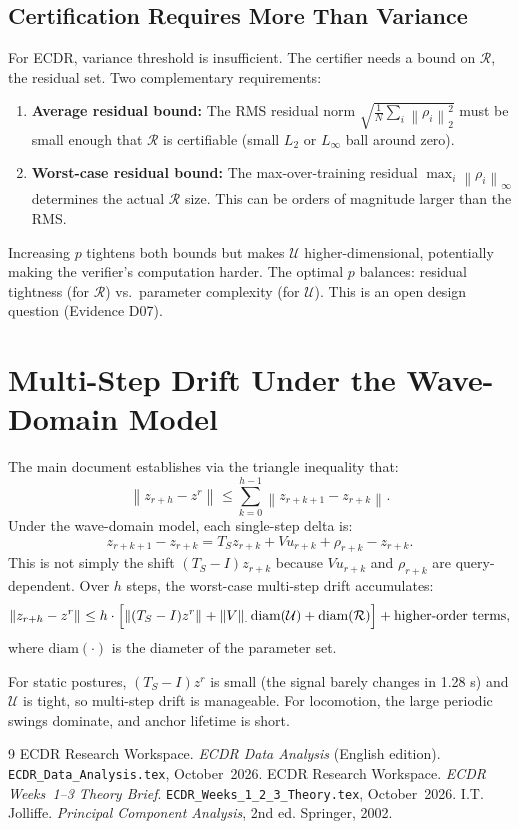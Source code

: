 \documentclass[11pt, a4paper]{article}
\theoremstyle{definition}
\theoremstyle{plain}
\newcommand{\norm}[2]{\left\|#1\right\|_{#2}}
\newcommand{\code}[1]{\texttt{#1}}
\begin{document}
\subsection{Certification Requires More Than Variance}

For ECDR, variance threshold is insufficient. The certifier needs a bound on
$\mathcal{R}$, the residual set. Two complementary requirements:

\begin{enumerate}[leftmargin=1.5em]
  \item \textbf{Average residual bound:} The RMS residual norm
        $\sqrt{\frac{1}{N}\sum_i \norm{\rho_i}{2}^2}$ must be small enough that
        $\mathcal{R}$ is certifiable (small $L_2$ or $L_\infty$ ball around zero).
  \item \textbf{Worst-case residual bound:} The max-over-training residual
        $\max_i \norm{\rho_i}{\infty}$ determines the actual $\mathcal{R}$ size.
        This can be orders of magnitude larger than the RMS.
\end{enumerate}

Increasing $p$ tightens both bounds but makes $\mathcal{U}$ higher-dimensional,
potentially making the verifier's computation harder. The optimal $p$ balances:
residual tightness (for $\mathcal{R}$) vs.\ parameter complexity (for $\mathcal{U}$).
This is an open design question (Evidence D07).

\section{Multi-Step Drift Under the Wave-Domain Model}

The main document establishes via the triangle inequality that:
\[
  \norm{z_{r+h} - z^r}{} \le \sum_{k=0}^{h-1} \norm{z_{r+k+1} - z_{r+k}}{}.
\]
Under the wave-domain model, each single-step delta is:
\[
  z_{r+k+1} - z_{r+k} = T_S z_{r+k} + V u_{r+k} + \rho_{r+k} - z_{r+k}.
\]
This is not simply the shift $(T_S - I)z_{r+k}$ because $V u_{r+k}$ and $\rho_{r+k}$
are query-dependent. Over $h$ steps, the worst-case multi-step drift accumulates:
\[
  \norm{z_{r+h} - z^r}{} \le h \cdot \Bigl[\norm{(T_S - I)z^r}{} + \norm{V}{\cdot}\text{diam}(\mathcal{U}) + \text{diam}(\mathcal{R})\Bigr] + \text{higher-order terms},
\]
where $\text{diam}(\cdot)$ is the diameter of the parameter set.

For static postures, $(T_S - I)z^r$ is small (the signal barely changes in 1.28 s)
and $\mathcal{U}$ is tight, so multi-step drift is manageable. For locomotion,
the large periodic swings dominate, and anchor lifetime is short.

\begin{thebibliography}{9}
  ECDR Research Workspace. \textit{ECDR Data Analysis} (English edition).
  \code{ECDR\_Data\_Analysis.tex}, October~2026.
  ECDR Research Workspace. \textit{ECDR Weeks~1--3 Theory Brief}.
  \code{ECDR\_Weeks\_1\_2\_3\_Theory.tex}, October~2026.
  I.T. Jolliffe. \textit{Principal Component Analysis}, 2nd ed. Springer, 2002.
\end{thebibliography}
\end{document}

